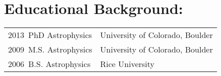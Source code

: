 \begin{minipage}{\textwidth}
\section*{Educational Background: }
\vspace{-4mm}
\begin{tabular} {ll}
    2013~PhD Astrophysics & University of Colorado, Boulder \\
    2009~M.S. Astrophysics & University of Colorado, Boulder \\
    2006~B.S. Astrophysics & Rice University \\
\end{tabular}

\end{minipage}
\vspace{4mm}
